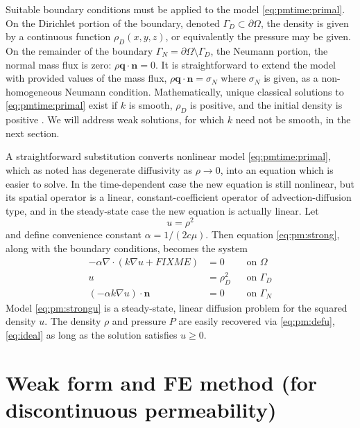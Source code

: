 \documentclass[11pt]{amsart}
\newcommand{\bn}{\mathbf{n}}
\newcommand{\bq}{\mathbf{q}}
\newcommand{\Div}{\nabla\cdot}
\newcommand{\grad}{\nabla}
\begin{document}
Suitable boundary conditions must be applied to the model \eqref{eq:pmtime:primal}.  On the Dirichlet portion of the boundary, denoted $\Gamma_D \subset \partial\Omega$, the density is given by a continuous function $\rho_D(x,y,z)$, or equivalently the pressure may be given.  On the remainder of the boundary $\Gamma_N = \partial\Omega \setminus \Gamma_D$, the Neumann portion, the normal mass flux is zero: $\rho\bq\cdot \bn = 0$.  It is straightforward to extend the model with provided values of the mass flux, $\rho\bq\cdot \bn = \sigma_N$ where $\sigma_N$ is given, as a non-homogeneous Neumann condition.  Mathematically, unique classical solutions to \eqref{eq:pmtime:primal} exist if $k$ is smooth, $\rho_D$ is positive, and the initial density is positive \citep[Theorem 3.1]{Vazquez2007}.  We will address weak solutions, for which $k$ need not be smooth, in the next section.

A straightforward substitution converts nonlinear model \eqref{eq:pmtime:primal}, which as noted has degenerate diffusivity as $\rho \to 0$, into an equation which is easier to solve.  In the time-dependent case the new equation is still nonlinear, but its spatial operator is a linear, constant-coefficient operator of advection-diffusion type, and in the steady-state case the new equation is actually linear.  Let
\begin{equation}
u = \rho^2 \label{eq:pm:defu}
\end{equation}
and define convenience constant $\alpha = 1/(2c\mu)$.  Then equation \eqref{eq:pm:strong}, along with the boundary conditions, becomes the system
\begin{subequations}
\label{eq:pm:strongu}
\begin{align}
- \alpha \Div\left(k \grad u + FIXME\right) &= 0 & &\text{on } \Omega \label{eq:pm:strongu:eqn} \\
u &= \rho_D^2 & &\text{on } \Gamma_D  \label{eq:pm:strongu:bcD} \\
\left(-\alpha k \grad u\right) \cdot \bn &= 0 & &\text{on } \Gamma_N  \label{eq:pm:strongu:bcN} 
\end{align}
\end{subequations}
Model \eqref{eq:pm:strongu} is a steady-state, linear diffusion problem for the squared density $u$.  The density $\rho$ and pressure $P$ are easily recovered via \eqref{eq:pm:defu}, \eqref{eq:ideal} as long as the solution satisfies $u\ge 0$.


\section{Weak form and FE method (for discontinuous permeability)}
\end{document}
